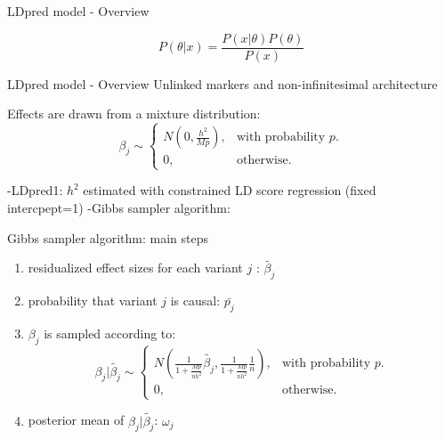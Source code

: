\documentclass{beamer}
\begin{document}
   \begin{frame}{LDpred model - Overview}
    
    \begin{equation}
    P(\theta|x)=\frac{P(x|\theta)P(\theta)}{P(x)}
  \end{equation}
\newline
\end{frame}

    \begin{frame}{LDpred model - Overview}
    Unlinked markers and non-infinitesimal architecture\\
    \newline
    
    Effects are drawn from a mixture distribution:
    \begin{equation}
 \beta_{j}\sim\begin{cases}
    N(0, \frac{h^2}{Mp}), & \text{with probability $p$}.\\
    0, & \text{otherwise}.
  \end{cases}
  \end{equation}
\newline

  -LDpred1: $h^2$ estimated with constrained LD score regression (fixed intercpept=1)
  \newline
  -Gibbs sampler algorithm:
  \end{frame}
    
       \begin{frame}{Gibbs sampler algorithm: main steps}
  \begin{enumerate}
    \item residualized effect sizes for each variant $j$ : $\tilde{\beta_{j}}$
      \item probability that variant $j$ is causal: $\bar{p_{j}}$
      \item $\beta_{j}$ is sampled according to:
         \begin{equation}
 \beta_{j}|\tilde{\beta_{j}}\sim\begin{cases}
    N(\frac{1}{1+\frac{Mp}{nh^2}}\tilde{\beta_{j}},\frac{1}{1+\frac{Mp}{nh^2}}\frac{1}{n}), & \text{with probability $p$}.\\
    0, & \text{otherwise}.
  \end{cases}
  \end{equation}
      \item posterior mean of $\beta_{j}|\tilde{\beta_{j}}$: $\omega_{j}$
  
  \end{enumerate}
  
       \end{frame}
       
\end{document}
